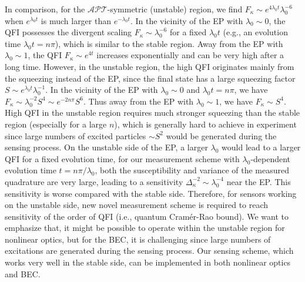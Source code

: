 \documentclass[twocolumn,prl,floatfix,citeautoscript,nofootinbib,superscriptaddress]{revtex4}
\begin{document}
\begin{widetext}
In comparison, for the $\mathcal{APT}$-symmetric (unstable) region, we find $%
F_{\kappa }\sim e^{4\lambda _{0}t}\lambda _{0}^{-6}$ when $e^{\lambda _{0}t}$
is much larger than $e^{-\lambda _{0}t}$. In the vicinity of the EP with $%
\lambda _{0}\sim 0$, the QFI possesses the divergent scaling $F_{\kappa
}\sim \lambda _{0}^{-6}$ for a fixed $\lambda _{0}t$ (e.g., an evolution
time $\lambda _{0}t=n\pi $), which is similar to the stable region. Away
from the EP with $\lambda _{0}\sim 1$, the QFI $F_{\kappa }\sim e^{4t}$
increases exponentially and can be very high after a long time. However, in
the unstable region, the high QFI originates mainly from the squeezing
instead of the EP, since the final state has a large squeezing factor $S\sim
e^{\lambda _{0}t}\lambda _{0}^{-1}$. In the vicinity of the EP with $\lambda
_{0}\sim 0$ and $\lambda _{0}t=n\pi $, we have $F_{\kappa }\sim \lambda
_{0}^{-2}S^{4}\sim e^{-2n\pi }S^{6}$. Thus away from the EP with $\lambda
_{0}\sim 1$, we have $F_{\kappa }\sim S^{4}$. High QFI in the unstable
region requires much stronger squeezing than the stable region (especially
for a large $n$), which is generally hard to achieve in experiment since
large numbers of excited particles $\sim S^{2}$ would be generated during
the sensing process. On the unstable side of the EP, a larger $\lambda _{0}$
would lead to a larger QFI for a fixed evolution time, for our measurement
scheme with $\lambda _{0}$-dependent evolution time $t=n\pi /\lambda _{0}$,
both the susceptibility and variance of the measured quadrature are very
large, leading to a sensitivity $\Delta _{\kappa }^{-2}\sim \lambda
_{0}^{-4} $ near the EP. This sensitivity is worse compared with the stable
side. Therefore, for sensors working on the unstable side, new novel
measurement scheme is required to reach sensitivity of the order of QFI
(i.e., quantum Cram\'{e}r-Rao bound). We want to emphasize that, it might be
possible to operate within the unstable region for nonlinear optics, but for
the BEC, it is challenging since large numbers of excitations are generated
during the sensing process. Our sensing scheme, which works very well in the
stable side, can be implemented in both nonlinear optics and BEC.


\end{widetext}
\end{document}

